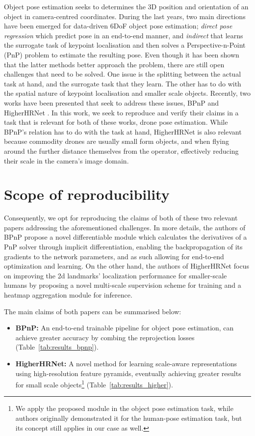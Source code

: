 Object pose estimation seeks to determines the 3D position and orientation of an object in camera-centred coordinates. 
During the last years, two main directions have been emerged for data-driven 6DoF object pose estimation; \textit{direct pose regression} which predict pose in an end-to-end manner, and \textit{indirect} that learns the surrogate task of keypoint localisation and then solves a Perspective-n-Point (PnP) problem to estimate the resulting pose.
Even though it has been shown \cite{sattler2019understanding} that the latter methods better approach the problem, there are still open challenges that need to be solved. 
One issue is the splitting between the actual task at hand, and the surrogate task that they learn.
The other has to do with the spatial nature of keypoint localisation and smaller scale objects.
Recently, two works have been presented that seek to address these issues, BPnP \cite{chen2020end} and HigherHRNet \cite{cheng2020higherhrnet}.
In this work, we seek to reproduce and verify their claims in a task that is relevant for both of these works, drone pose estimation.
While BPnP's relation has to do with the task at hand, HigherHRNet is also relevant because commodity drones are usually small form objects, and when flying around the further distance themselves from the operator, effectively reducing their scale in the camera's image domain.

\section{Scope of reproducibility}
\label{sec:claims}
Consequently, we opt for reproducing the claims of both of these two relevant papers addressing the aforementioned challenges. 
In more details, the authors of BPnP \cite{chen2020end} propose a novel differentiable module which calculates the derivatives of a PnP solver through implicit differentiation, enabling the backpropagation of its gradients to the network parameters, and as such allowing for end-to-end optimization and learning. 
On the other hand, the authors of HigherHRNet \cite{cheng2020higherhrnet} focus on improving the 2d landmarks' localization performance for smaller-scale humans by proposing a novel multi-scale supervision scheme for training and a heatmap aggregation module for inference.

The main claims of both papers can be summarised below:

\begin{itemize}
    \item \textbf{BPnP:} An end-to-end trainable pipeline for object pose estimation, can achieve greater accuracy by combing the reprojection losses (Table~\ref{tab:results_bpnp}).
    \item \textbf{HigherHRNet:} A novel method for learning scale-aware representations using high-resolution feature pyramids, eventually achieving greater results for small scale objects\footnote{We apply the proposed module in the object pose estimation task, while authors originally demonstrated it for the human-pose estimation task, but its concept still applies in our case as well.} (Table~\ref{tab:results_higher}).
\end{itemize}



